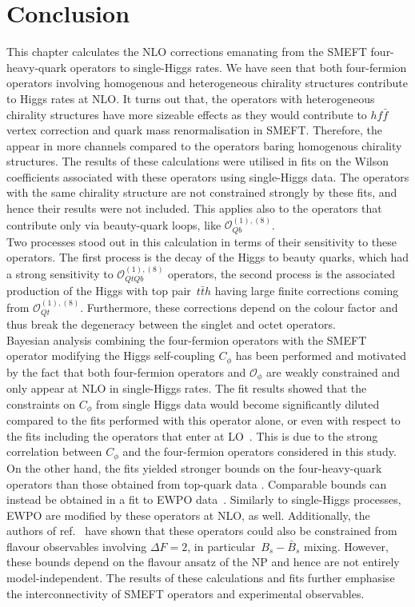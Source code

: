 	\section{Conclusion \label{sec:conclusion4tops}}
	This chapter calculates the NLO corrections emanating from the SMEFT four-heavy-quark operators to single-Higgs rates. We have seen that both four-fermion operators involving homogenous and heterogeneous chirality structures contribute to Higgs rates at NLO. It turns out that, the operators with heterogeneous chirality structures have more sizeable effects as they would contribute to $h f\bar f$ vertex correction and quark mass renormalisation in SMEFT. Therefore, the appear in more channels compared to the operators baring homogenous chirality structures. The results of these calculations were utilised in fits on the Wilson coefficients associated with these operators using single-Higgs data. The operators with the same chirality structure are not constrained strongly by these fits, and hence their results were not included. This applies also to the operators that contribute only via beauty-quark loops, like $\mathcal{O}_{Qb}^{(1),(8)}$. \\ Two processes stood out in this calculation in terms of their sensitivity to these operators. The first process is the decay of the Higgs to beauty quarks, which had a strong sensitivity to $\mathcal{O}_{QtQb}^{(1),(8)}$ operators, the second process is the associated production of the Higgs with top pair~$t \bar th$ having large finite corrections coming from $\mathcal{O}_{Qt}^{(1),(8)}$. Furthermore, these corrections depend on the colour factor and thus break the degeneracy between the singlet and octet operators. \\
	Bayesian analysis combining the four-fermion operators with the SMEFT operator modifying the Higgs self-coupling $C_\phi$ has been performed and motivated by the fact that both  four-fermion operators and $\mathcal{O}_\phi$ are weakly constrained and only appear at NLO in single-Higgs rates. The fit results showed that the constraints on $C_\phi$ from single Higgs data would become significantly diluted compared to the fits performed with this operator alone, or even with respect to the fits including the operators that  enter at LO~\cite{Gorbahn:2016uoy, Degrassi:2016wml, Bizon:2016wgr, Maltoni:2017ims, Degrassi:2021uik}. This is due to the strong correlation between $C_\phi$ and the four-fermion operators considered in this study. On the other hand, the fits yielded stronger bounds on the four-heavy-quark operators than those obtained from top-quark data \cite{Ethier:2021bye, Hartland:2019bjb}. Comparable bounds can instead be obtained in a fit to EWPO data~\cite{Dawson:2022bxd}. Similarly to single-Higgs processes, EWPO are modified by these operators at NLO, as well. Additionally, the authors of ref.~\cite{Silvestrini:2018dos} have shown that these operators could also be constrained from flavour observables involving $\Delta F=2$, in particular~$B_s -\bar{B}_s$ mixing. However, these bounds depend on the flavour ansatz of the NP and hence are not entirely model-independent. The results of these calculations and fits further emphasise the interconnectivity of SMEFT operators and experimental observables.\\
